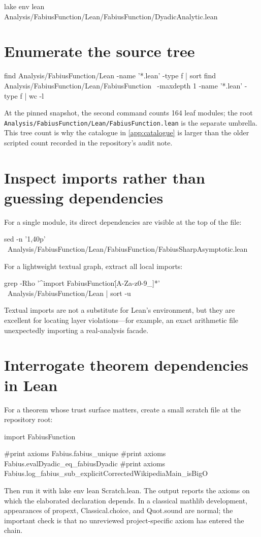 \documentclass[11pt,a4paper,openany]{book}
\def\code#1{#1}
\newcommand{\code}[1]{\texttt{\detokenize{#1}}}
\newcommand{\pathbreak}[1]{\nolinkurl{#1}}
\begin{document}
\begin{ShellCode}
lake env lean Analysis/FabiusFunction/Lean/FabiusFunction/DyadicAnalytic.lean
\end{ShellCode}

\section{Enumerate the source tree}
\begin{ShellCode}
find Analysis/FabiusFunction/Lean -name '*.lean' -type f | sort
find Analysis/FabiusFunction/Lean/FabiusFunction \
  -maxdepth 1 -name '*.lean' -type f | wc -l
\end{ShellCode}
At the pinned snapshot, the second command counts 164 leaf modules; the root
\pathbreak{Analysis/FabiusFunction/Lean/FabiusFunction.lean} is the separate
umbrella.  This tree count is why the catalogue in \cref{app:catalogue} is
larger than the older scripted count recorded in the repository's audit note.

\section{Inspect imports rather than guessing dependencies}
For a single module, its direct dependencies are visible at the top of the
file:

\begin{ShellCode}
sed -n '1,40p' \
  Analysis/FabiusFunction/Lean/FabiusFunction/FabiusSharpAsymptotic.lean
\end{ShellCode}
For a lightweight textual graph, extract all local imports:

\begin{ShellCode}
grep -Rho '^import FabiusFunction\.[A-Za-z0-9_]*' \
  Analysis/FabiusFunction/Lean | sort -u
\end{ShellCode}
Textual imports are not a substitute for Lean's environment, but they are
excellent for locating layer violations---for example, an exact arithmetic
file unexpectedly importing a real-analysis facade.

\section{Interrogate theorem dependencies in Lean}
For a theorem whose trust surface matters, create a small scratch file at the
repository root:

\begin{LeanCode}
import FabiusFunction

#print axioms Fabius.fabius_unique
#print axioms Fabius.evalDyadic_eq_fabiusDyadic
#print axioms Fabius.log_fabius_sub_explicitCorrectedWikipediaMain_isBigO
\end{LeanCode}
Then run it with \code{lake env lean Scratch.lean}.  The output reports the
axioms on which the elaborated declaration depends.  In a classical mathlib
development, appearances of \code{propext}, \code{Classical.choice}, and
\code{Quot.sound} are normal; the important check is that no unreviewed
project-specific axiom has entered the chain.
\end{document}
